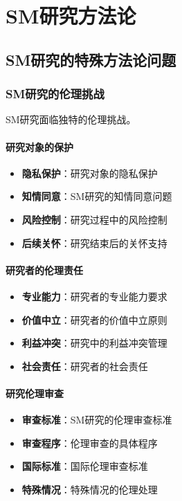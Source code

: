 \documentclass[12pt,UTF8]{ctexbook}
\begin{document}
\part{SM研究方法论}

\chapter{SM研究的特殊方法论问题}
\section{SM研究的伦理挑战}
SM研究面临独特的伦理挑战。

\subsection{研究对象的保护}
\begin{itemize}[leftmargin=2cm]
	\item \textbf{隐私保护}：研究对象的隐私保护
	\item \textbf{知情同意}：SM研究的知情同意问题
	\item \textbf{风险控制}：研究过程中的风险控制
	\item \textbf{后续关怀}：研究结束后的关怀支持
\end{itemize}

\subsection{研究者的伦理责任}
\begin{itemize}[leftmargin=2cm]
	\item \textbf{专业能力}：研究者的专业能力要求
	\item \textbf{价值中立}：研究者的价值中立原则
	\item \textbf{利益冲突}：研究中的利益冲突管理
	\item \textbf{社会责任}：研究者的社会责任
\end{itemize}

\subsection{研究伦理审查}
\begin{itemize}[leftmargin=2cm]
	\item \textbf{审查标准}：SM研究的伦理审查标准
	\item \textbf{审查程序}：伦理审查的具体程序
	\item \textbf{国际标准}：国际伦理审查标准
	\item \textbf{特殊情况}：特殊情况的伦理处理
\end{itemize}
\end{document}
